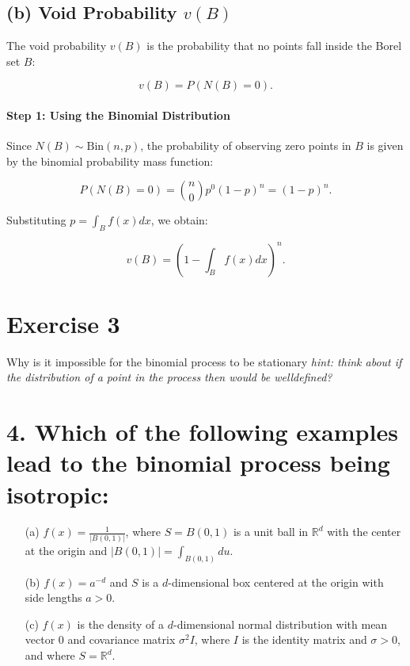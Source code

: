 \documentclass{article}
\begin{document}
\subsection*{(b) Void Probability $v(B)$}

The void probability $v(B)$ is the probability that no points fall inside the Borel set $B$:

\[
    v(B) = P(N(B) = 0).
\]

\paragraph{Step 1: Using the Binomial Distribution}
Since $N(B) \sim \text{Bin}(n, p)$, the probability of observing zero points in $B$ is given by the binomial probability mass function:

\[
    P(N(B) = 0) = \binom{n}{0} p^0 (1 - p)^n = (1 - p)^n.
\]

Substituting $p = \int_B f(x) dx$, we obtain:

\[
    v(B) = \left( 1 - \int_B f(x) dx \right)^n.
\]

\section*{Exercise 3}
Why is it impossible for the binomial process to be stationary \textit{hint: think
about if the distribution of a point in the process then would be welldefined?}
\section*{4. Which of the following examples lead to the binomial process being isotropic:}
\begin{enumerate}
    \item[(a)] $f(x) = \frac{1}{|B(0, 1)|}$, where $S = B(0, 1)$ is a unit ball in $\mathbb{R}^d$ with the center at the origin and $|B(0, 1)| = \int_{B(0,1)} du$.
    
    \item[(b)] $f(x) = a^{-d}$ and $S$ is a $d$-dimensional box centered at the origin with side lengths $a > 0$.
    
    \item[(c)] $f(x)$ is the density of a $d$-dimensional normal distribution with mean vector 0 and covariance matrix $\sigma^2 I$, where $I$ is the identity matrix and $\sigma > 0$, and where $S = \mathbb{R}^d$.
\end{enumerate}
\end{document}
